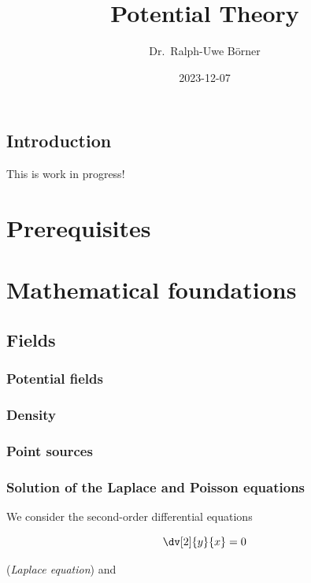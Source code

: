 \documentclass[
  a4paper,
  DIV=11,
  numbers=noendperiod]{scrreprt}
\title{Potential Theory}
\author{Dr.~Ralph-Uwe Börner}
\date{2023-12-07}
\renewcommand*\contentsname{Table of contents}
\newcommand\contentsname{Table of contents}
\begin{document}
\maketitle
\renewcommand*\contentsname{Table of contents}
{
\hypersetup{linkcolor=}
\setcounter{tocdepth}{2}
\tableofcontents
}

\chapter{Introduction}\label{introduction}

This is work in progress!

\part{Prerequisites}

\part{Mathematical foundations}

\chapter{Fields}\label{fields}

\section{Potential fields}\label{potential-fields}

\section{Density}\label{density}

\section{Point sources}\label{point-sources}

\section{Solution of the Laplace and Poisson
equations}\label{solution-of-the-laplace-and-poisson-equations}

We consider the second-order differential equations

\[
\dv[2]{y}{x} = 0
\]

(\emph{Laplace equation}) and
\end{document}
